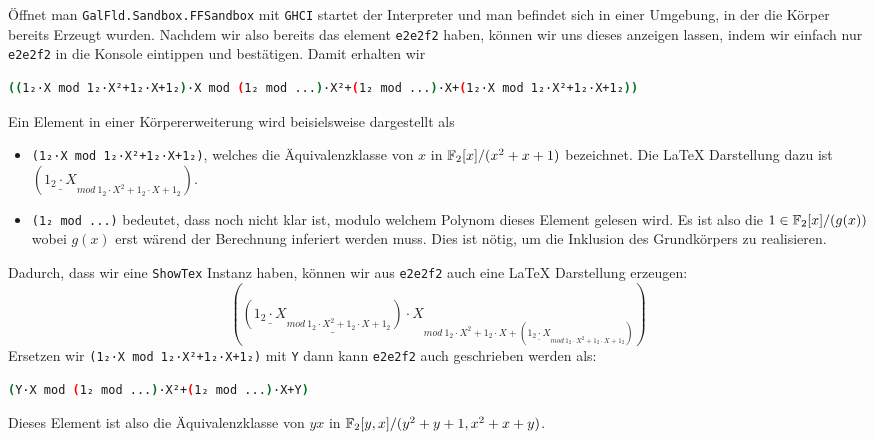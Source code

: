 Öffnet man \texttt{GalFld.Sandbox.FFSandbox} mit \texttt{GHCI} startet der
Interpreter und man befindet sich in einer Umgebung, in der die Körper bereits
Erzeugt wurden. Nachdem wir also bereits das element \texttt{e2e2f2} haben,
können wir uns dieses anzeigen lassen, indem wir einfach nur \texttt{e2e2f2} in
die Konsole eintippen und bestätigen. Damit erhalten wir
\begin{lstlisting}[language=bash
                  ,numbers=none
                  ,backgroundcolor=\color{lightgray}]
((1₂·X mod 1₂·X²+1₂·X+1₂)·X mod (1₂ mod ...)·X²+(1₂ mod ...)·X+(1₂·X mod 1₂·X²+1₂·X+1₂))
\end{lstlisting}
Ein Element in einer Körpererweiterung wird beisielsweise dargestellt als
\begin{itemize}
  \item \texttt{(1₂·X mod 1₂·X²+1₂·X+1₂)}, welches die Äquivalenzklasse von $x$
  in $\mathbb{F}_2[x]/(x^2+x+1)$ bezeichnet. Die \LaTeX{} Darstellung dazu ist 
  $\left(
      \underline{
        1_{2}
        \cdot{}X
      }_{
        mod~1_{2} \cdot{}X^{2}+1_{2}\cdot{}X+1_{2}
      }
    \right)$.
  \item \texttt{(1₂ mod ...)} bedeutet, dass noch nicht klar ist, modulo
  welchem Polynom dieses Element gelesen wird. Es ist also die
  $1\in\mathbb{F}_2[x]/(g(x))$
  wobei $g(x)$ erst wärend der Berechnung inferiert werden muss.
  Dies ist nötig, um die Inklusion des Grundkörpers zu realisieren.
\end{itemize}
Dadurch, dass wir eine \texttt{ShowTex} Instanz haben, können wir aus
\texttt{e2e2f2} auch eine \LaTeX{} Darstellung erzeugen:
\[
\left(
  \underline{
    \left(
      \underline{
        1_{2}
        \cdot{}X
      }_{
        mod~1_{2} \cdot{}X^{2}+1_{2}\cdot{}X+1_{2}
      }
    \right)\cdot{}X
  }_{
    mod~1_{2}\cdot{}X^{2}+1_{2}\cdot{}X+\left(
      \underline{
        1_{2}\cdot{}X
      }_{
        mod~1_{2}\cdot{}X^{2}+1_{2}\cdot{}X+1_{2}
      }
    \right)
  }
\right)
\]
Ersetzen wir \texttt{(1₂·X mod 1₂·X²+1₂·X+1₂)} mit \texttt{Y} dann kann
\texttt{e2e2f2} auch geschrieben werden als:
\begin{lstlisting}[language=bash
                  ,numbers=none
                  ,backgroundcolor=\color{lightgray}]
(Y·X mod (1₂ mod ...)·X²+(1₂ mod ...)·X+Y)
\end{lstlisting}
Dieses Element ist also die Äquivalenzklasse von $yx$ in
$\mathbb{F}_2[y,x]/(y^2+y+1,x^2+x+y)$.

